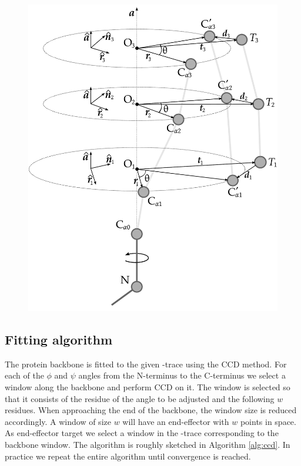 \begin{figure}
  \centering
	\includegraphics[width=0.98\columnwidth]{figures/ccd}
	\label{fig:ccd}
  \caption{}
\end{figure}


\subsection{Fitting algorithm}
The protein backbone is fitted to the given \Ca-trace using the CCD method.
For each of the $\phi$ and $\psi$ angles from the N-terminus to the C-terminus we select a window along the backbone and perform CCD on it.
The window is selected so that it consists of the residue of the angle to be adjusted and the following $w$ residues. 
When approaching the end of the backbone, the window size is reduced accordingly.
A window of size $w$ will have an end-effector with $w$ points in space.
As end-effector target we select a window in the \Ca-trace corresponding to the backbone window. 
The algorithm is roughly sketched in Algorithm \ref{alg:ccd}.
In practice we repeat the entire algorithm until convergence is reached.


